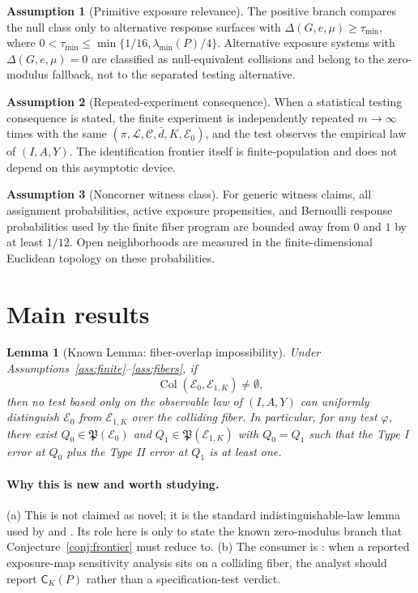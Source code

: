 \documentclass[11pt]{article}
\theoremstyle{definition}
\newtheorem{assumption}{Assumption}
\theoremstyle{plain}
\newtheorem{lemma}{Lemma}
\theoremstyle{remark}
\begin{document}
\begin{assumption}[Primitive exposure relevance]\label{ass:relevance}
The positive branch compares the null class only to alternative response surfaces with \(\Delta(G,e,\mu)\ge\tau_{\min}\), where \(0<\tau_{\min}\le\min\{1/16,\lambda_{\min}(P)/4\}\).  Alternative exposure systems with \(\Delta(G,e,\mu)=0\) are classified as null-equivalent collisions and belong to the zero-modulus fallback, not to the separated testing alternative.
\end{assumption}

\begin{assumption}[Repeated-experiment consequence]\label{ass:repeated}
When a statistical testing consequence is stated, the finite experiment is independently repeated \(m\to\infty\) times with the same \((\pi,\mathcal L,\mathcal C,\bar d,K,\mathcal E_0)\), and the test observes the empirical law of \((I,A,Y)\).  The identification frontier itself is finite-population and does not depend on this asymptotic device.
\end{assumption}

\begin{assumption}[Noncorner witness class]\label{ass:noncorner}
For generic witness claims, all assignment probabilities, active exposure propensities, and Bernoulli response probabilities used by the finite fiber program are bounded away from \(0\) and \(1\) by at least \(1/12\).  Open neighborhoods are measured in the finite-dimensional Euclidean topology on these probabilities.
\end{assumption}

\section{Main results}
\begin{lemma}[Known Lemma: fiber-overlap impossibility]\label{lem:overlap-impossibility}
Under Assumptions~\ref{ass:finite}--\ref{ass:fibers}, if
\[
\operatorname{Col}(\mathcal E_0,\mathcal E_{1,K})\ne\emptyset,
\]
then no test based only on the observable law of \((I,A,Y)\) can uniformly distinguish \(\mathcal E_0\) from \(\mathcal E_{1,K}\) over the colliding fiber.  In particular, for any test \(\varphi\), there exist \(Q_0\in\mathfrak P(\mathcal E_0)\) and \(Q_1\in\mathfrak P(\mathcal E_{1,K})\) with \(Q_0=Q_1\) such that the Type I error at \(Q_0\) plus the Type II error at \(Q_1\) is at least one.
\end{lemma}
\paragraph{Why this is new and worth studying.}
(a) This is not claimed as novel; it is the standard indistinguishable-law lemma used by \citet[Chapter~6]{LeCam1986} and \citet{GaoHarshawSavjeWang2026}.  Its role here is only to state the known zero-modulus branch that Conjecture~\ref{conj:frontier} must reduce to.  (b) The consumer is \citet{SchroderOprescuFeuerriegelKallus2026}: when a reported exposure-map sensitivity analysis sits on a colliding fiber, the analyst should report \(\mathsf C_K(P)\) rather than a specification-test verdict.
\end{document}
